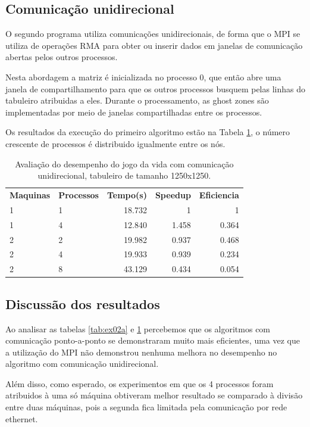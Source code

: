 \documentclass[conference]{IEEEtran}
\begin{document}
\subsection{Comunicação unidirecional \label{sec:ex02b}}
O segundo programa utiliza comunicações unidirecionais, de forma que o MPI se utiliza de operações RMA para obter ou inserir dados em janelas de comunicação abertas pelos outros processos.

Nesta abordagem a matriz é inicializada no processo 0, que então abre uma janela de compartilhamento para que os outros processos busquem pelas linhas do tabuleiro atribuidas a eles. Durante o processamento, as ghost zones são implementadas por meio de janelas compartilhadas entre os processos.


Os resultados da execução do primeiro algoritmo estão na Tabela \ref{tab:ex02b}, o número crescente de processos é distribuido igualmente entre os nós.

\begin{table}[htb!]
  \centering
	\begin{adjustbox}{max width=\linewidth}
	\begin{tabular}{llrrr}%
		\bfseries Maquinas & \bfseries Processos & \bfseries Tempo(s) & \bfseries Speedup & \bfseries Eficiencia  \\
    1	& 1 &	18.732 & 1	   & 1     \\
    1	& 4 &	12.840 & 1.458 & 0.364 \\
    2	& 2 &	19.982 & 0.937 & 0.468 \\
    2	& 4 &	19.933 & 0.939 & 0.234 \\
    2	& 8 &	43.129 & 0.434 & 0.054 \\
	\end{tabular}
	\end{adjustbox}
	\caption{\label{tab:ex02b}Avaliação do desempenho do jogo da vida com comunicação unidirecional, tabuleiro de tamanho 1250x1250.}
\end{table}

\subsection{Discussão dos resultados}
Ao analisar as tabelas \ref{tab:ex02a} e \ref{tab:ex02b} percebemos que os algoritmos com comunicação ponto-a-ponto se demonstraram muito mais eficientes, uma vez que a utilização do MPI não demonstrou nenhuma melhora no desempenho no algoritmo com comunicação unidirecional.

Além disso, como esperado, os experimentos em que os 4 processos foram atribuidos à uma só máquina obtiveram melhor resultado se comparado à divisão entre duas máquinas, pois a segunda fica limitada pela comunicação por rede ethernet.
\end{document}
